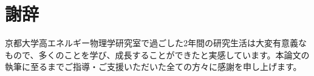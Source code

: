 \chapter{謝辞}

京都大学高エネルギー物理学研究室で過ごした2年間の研究生活は大変有意義なもので、多くのことを学び、成長することができたと実感しています。本論文の執筆に至るまでご指導・ご支援いただいた全ての方々に感謝を申し上げます。
